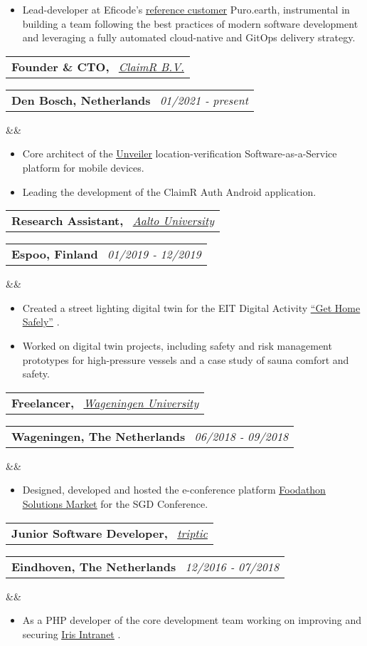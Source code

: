 \documentclass[11pt,a4paper,sans]{moderncv}
\makeatletter
\newcommand*{\customcventry}[7][.13em]{
\begin{tabular}{@{}l}
{\bfseries #4} \
{\itshape #3}
\end{tabular}
\hfill
\begin{tabular}{l@{}}
{\bfseries #5} \
{\itshape #2}
\end{tabular}
\ifx&#7&%
\else{\
\begin{minipage}{\maincolumnwidth}%
\small#7%
\end{minipage}}\fi%
\par\addvspace{#1}}
\newcommand{\inlineLink}[2]{%
    \underline{\href{#1}{#2}}%
}
\makeatother
\begin{document}
{{\begin{itemize}[leftmargin=0.6cm, label={\textbullet}]
 		\item Lead-developer at Eficode's {\inlineLink{https://www.eficode.com/cases/puro.earth}{reference customer}} Puro.earth, instrumental in building a team following the best practices of modern software development and leveraging a fully automated cloud-native and GitOps delivery strategy.
 	\end{itemize}
 }
  
 \customcventry{01/2021 ‐ present}
 {{\color{blue}\href{https://claimr.tools}{ClaimR B.V.}}}
 {Founder \& CTO,}
 {Den Bosch, Netherlands}
 {}{}
 {
 	\begin{itemize}[leftmargin=0.6cm, label={\textbullet}]
 		\item Core architect of the {\inlineLink{https://unveiler.io}{Unveiler}} location-verification Software-as-a-Service platform for mobile devices. 
 		\item Leading the development of the ClaimR Auth Android application.
 	\end{itemize}
 }
  
  
 \customcventry{01/2019 ‐ 12/2019}
 {{\color{blue}\href{https://www.aalto.fi/en}{Aalto University}}}
 {Research Assistant,}
 {Espoo, Finland}
 {}{}
 {
 	\begin{itemize}[leftmargin=0.6cm, label={\textbullet}]
 		\item Created a street lighting digital twin for the EIT Digital Activity \inlineLink{https://web.archive.org/web/20200805070817/https://cyphylab.chora.tu-berlin.de/gethomesafely/}{``Get Home Safely''}.
 		\item Worked on digital twin projects, including safety and risk management prototypes for high-pressure vessels and a case study of sauna comfort and safety.
 	\end{itemize}
 }
  
 \customcventry{06/2018 ‐ 09/2018}
 {{\color{blue}\href{https://wur.nl/en}{Wageningen University}}}
 {Freelancer,}
 {Wageningen, The Netherlands}
 {}{}
 {
 	\begin{itemize}[leftmargin=0.6cm, label={\textbullet}]
 		\item Designed, developed and hosted the e-conference platform \inlineLink{https://foodathon.github.io/}{Foodathon Solutions Market} for the SGD Conference.
 	\end{itemize}
 }
  
 \customcventry{12/2016 ‐ 07/2018}
 {{\color{blue}\href{https://www.triptic.nl/}{triptic}}}
 {Junior Software Developer,}
 {Eindhoven, The Netherlands}
 {}{}
 {
 	\begin{itemize}[leftmargin=0.6cm, label={\textbullet}]
 		\item As a PHP developer of the core development team working on improving and securing \inlineLink{https://www.irisintranet.com/}{Iris Intranet}.
 	\end{itemize}
 }
}
\end{document}
